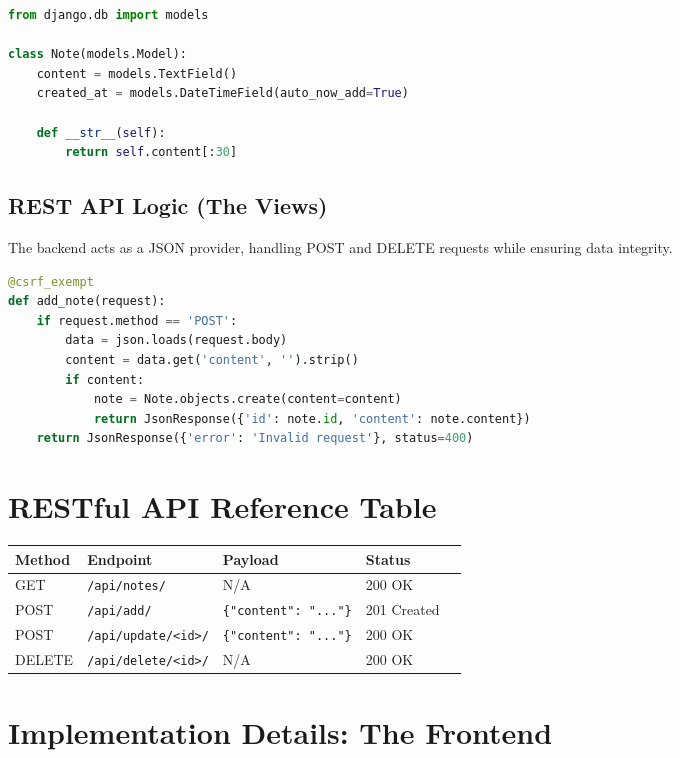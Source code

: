 \documentclass[11pt,a4paper]{article}
\begin{document}
\begin{lstlisting}[language=Python, caption=myapp/models.py]
from django.db import models

class Note(models.Model):
    content = models.TextField()
    created_at = models.DateTimeField(auto_now_add=True)

    def __str__(self):
        return self.content[:30]
\end{lstlisting}

\subsection{REST API Logic (The Views)}
The backend acts as a JSON provider, handling POST and DELETE requests while ensuring data integrity.

\begin{lstlisting}[language=Python, caption=myapp/views.py - Add Note Endpoint]
@csrf_exempt
def add_note(request):
    if request.method == 'POST':
        data = json.loads(request.body)
        content = data.get('content', '').strip()
        if content:
            note = Note.objects.create(content=content)
            return JsonResponse({'id': note.id, 'content': note.content})
    return JsonResponse({'error': 'Invalid request'}, status=400)
\end{lstlisting}

\section{RESTful API Reference Table}
\begin{table}[h]
    \centering
    \begin{tabular}{lp{3cm}lll}
        \toprule
        \textbf{Method} & \textbf{Endpoint} & \textbf{Payload} & \textbf{Status} \\ \midrule
        GET & \texttt{/api/notes/} & N/A & 200 OK \\
        POST & \texttt{/api/add/} & \texttt{\{"content": "..."\}} & 201 Created \\
        POST & \texttt{/api/update/<id>/} & \texttt{\{"content": "..."\}} & 200 OK \\
        DELETE & \texttt{/api/delete/<id>/} & N/A & 200 OK \\ \bottomrule
    \end{tabular}
\end{table}

\newpage
\section{Implementation Details: The Frontend}
\end{document}
